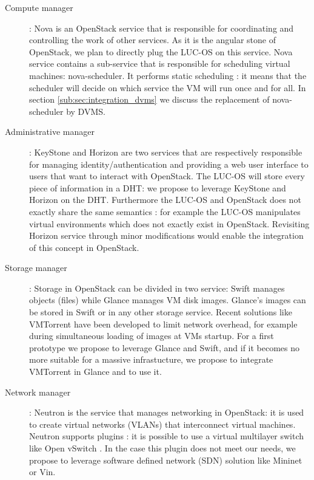 \begin{description}

	\item [Compute manager] : Nova is an OpenStack service that is 
	responsible for coordinating and controlling the work of other services.
	As it is the angular stone of OpenStack, we plan to directly plug the 
	LUC-OS on this service. Nova service contains a sub-service that is
	responsible for scheduling virtual machines: nova-scheduler. It performs
	static scheduling : it means that the scheduler will decide on which
	service the VM will run once and for all. In section 
	\ref{sub:sec:integration_dvms} we discuss the replacement of 
	nova-scheduler by DVMS.


	\item [Administrative manager] : KeyStone and Horizon are two services
	that are respectively responsible for managing identity/authentication
	and providing a web user interface to users that want to interact with
	OpenStack. The LUC-OS will store every piece of information in a DHT: we
	propose to leverage KeyStone and Horizon on the DHT. Furthermore the 
	LUC-OS and OpenStack does not exactly share the same semantics : for
	example the LUC-OS manipulates virtual environments which does not
	exactly exist in OpenStack. Revisiting Horizon service through minor
	modifications would enable the integration of this concept in OpenStack.

	\item [Storage manager] : Storage in OpenStack can be divided in two
	service: Swift manages objects (files) while Glance manages VM disk
	images. Glance's images can be stored in Swift or in any other storage
	service. Recent solutions like VMTorrent \cite{reich:2012} have been
	developed to limit network overhead, for example during simultaneous 
	loading of images at VMs startup. For a first prototype we propose to 
	leverage Glance and Swift, and if it becomes no more suitable for a
	massive infrastucture, we propose to integrate VMTorrent in Glance and 
	to use it.

	\item [Network manager] : Neutron is the service that manages networking
	in OpenStack: it is used to create virtual networks (VLANs) that
	interconnect virtual machines. Neutron supports plugins : it is possible
	to use a virtual multilayer switch like Open vSwitch \cite{pfaff:2009}.
	In the case this plugin does not meet our needs, we propose to 
	leverage software defined network (SDN) solution like Mininet 
	\cite{lantz:2010} or Vin.

\end{description}




